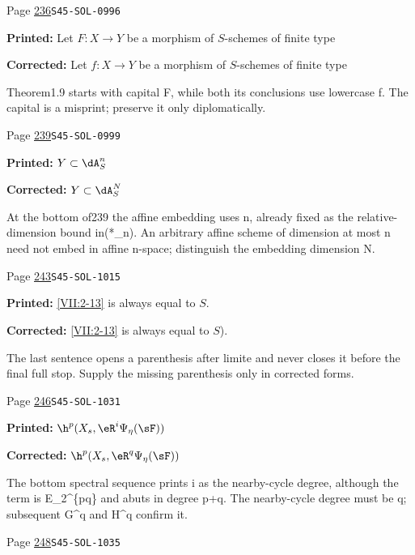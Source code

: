 \begin{description}
\smallskip
\item[\hypertarget{apparatus:EN-0172}{172}] Page \hyperlink{printpage:en:236}{236}\quad\texttt{S45-SOL-0996}
\par\noindent\textbf{Printed:} Let $F:X\to Y$ be a morphism of $S$-schemes of finite type
\par\noindent\textbf{Corrected:} Let $f:X\to Y$ be a morphism of $S$-schemes of finite type
\par\noindent Theorem1.9 starts with capital F, while both its conclusions use lowercase f. The capital is a misprint; preserve it only diplomatically.
\smallskip
\item[\hypertarget{apparatus:EN-0173}{173}] Page \hyperlink{printpage:en:239}{239}\quad\texttt{S45-SOL-0999}
\par\noindent\textbf{Printed:} \(Y\subset \dA_S^n\)
\par\noindent\textbf{Corrected:} \(Y\subset \dA_S^N\)
\par\noindent At the bottom of239 the affine embedding uses n, already fixed as the relative-dimension bound in(*\_n). An arbitrary affine scheme of dimension at most n need not embed in affine n-space; distinguish the embedding dimension N.
\smallskip
\item[\hypertarget{apparatus:EN-0174}{174}] Page \hyperlink{printpage:en:243}{243}\quad\texttt{S45-SOL-1015}
\par\noindent\textbf{Printed:} \ref{VII:2-13} is always equal to $S$.
\par\noindent\textbf{Corrected:} \ref{VII:2-13} is always equal to $S$).
\par\noindent The last sentence opens a parenthesis after limite and never closes it before the final full stop. Supply the missing parenthesis only in corrected forms.
\smallskip
\item[\hypertarget{apparatus:EN-0175}{175}] Page \hyperlink{printpage:en:246}{246}\quad\texttt{S45-SOL-1031}
\par\noindent\textbf{Printed:} \(\h^p(X_s,\eR^i\Psi_\eta(\sF))\)
\par\noindent\textbf{Corrected:} \(\h^p(X_s,\eR^q\Psi_\eta(\sF))\)
\par\noindent The bottom spectral sequence prints i as the nearby-cycle degree, although the term is E\_2\textasciicircum{}\{pq\} and abuts in degree p+q. The nearby-cycle degree must be q; subsequent G\textasciicircum{}q and H\textasciicircum{}q confirm it.
\smallskip
\item[\hypertarget{apparatus:EN-0176}{176}] Page \hyperlink{printpage:en:248}{248}\quad\texttt{S45-SOL-1035}

\end{description}
